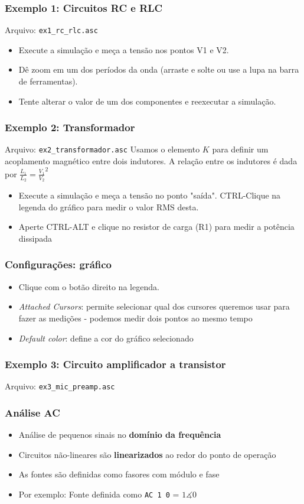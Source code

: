 \documentclass{beamer}
\begin{document}
\begin{frame}
\frametitle{Exemplo 1: Circuitos RC e RLC}
Arquivo: \texttt{ex1\_rc\_rlc.asc}
\begin{itemize}
\item{Execute a simulação e meça a tensão nos pontos V1 e V2.}
\item{Dê zoom em um dos períodos da onda (arraste e solte ou use a lupa na barra de ferramentas).}
\item{Tente alterar o valor de um dos componentes e reexecutar a simulação.}
\end{itemize}
\end{frame}

\begin{frame}
\frametitle{Exemplo 2: Transformador}
Arquivo: \texttt{ex2\_transformador.asc}
Usamos o elemento $K$ para definir um acoplamento magnético entre dois indutores. 
A relação entre os indutores é dada por $\frac{L_1}{L_2} = \frac{V_1}{V_2}^2$
\begin{itemize}
\item{Execute a simulação e meça a tensão no ponto "saída". CTRL-Clique na legenda do gráfico para medir o valor RMS desta}.
\item{Aperte CTRL-ALT e clique no resistor de carga (R1) para medir a potência dissipada}
\end{itemize}
\end{frame}

\begin{frame}
\frametitle{Configurações: gráfico}
\begin{itemize}
\item{Clique com o botão direito na legenda.}
\item{\textit{Attached Cursors}: permite selecionar qual dos cursores queremos usar para fazer as medições - podemos medir dois pontos ao mesmo tempo}
\item{\textit{Default color}}: define a cor do gráfico selecionado
\end{itemize}
\end{frame}


\begin{frame}
\frametitle{Exemplo 3: Circuito amplificador a transistor}
Arquivo: \texttt{ex3\_mic\_preamp.asc}
\end{frame}


\begin{frame}
\frametitle{Análise AC}
\begin{itemize}
\item{Análise de pequenos sinais no \textbf{domínio da frequência}}
\item{Circuitos não-lineares são \textbf{linearizados} ao redor do ponto de operação}
\item{As fontes são definidas como fasores com módulo e fase}
\item{Por exemplo: Fonte definida como \texttt{AC 1 0} = $1\measuredangle 0$} 
\end{itemize}
\end{frame}
\end{document}
